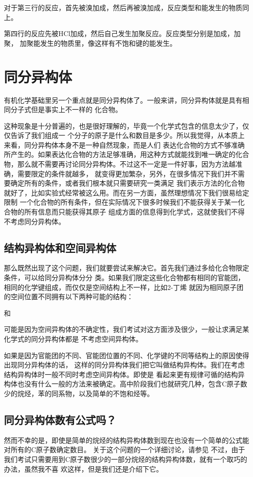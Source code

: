对于第三行的反应，首先被溴加成，然后再被溴加成，反应类型和能发生的物质同上。

第四行的反应先被HCl加成，然后自己发生加聚反应。反应类型分别是加成，加聚，
加聚能发生的物质里，像这样有不饱和键的能发生。

\section{同分异构体}
有机化学基础里另一个重点就是同分异构体了。一般来讲，同分异构体就是具有相同分子式但是事实上不一样的
化合物。

这种现象是十分普遍的，也是很好理解的，毕竟一个化学式包含的信息太少了，仅仅告诉了我们组成一
个分子的原子是什么和数目是多少。所以我觉得，从本质上来看，同分异构体本身不是一种自然现象，而是人们
表达化合物的方式不够准确所产生的。如果表达化合物的方法足够准确，用这种方式就能找到唯一确定的化合
物，那么就不需要再讨论同分异构体。不过这不一定是一件好事，因为方法越准确，需要限定的条件就越多，
就变得更加繁杂，另外，在很多情况下我们并不需要确定所有的条件，或者我们根本就只需要研究一类满足
我们表示方法的化合物就好了，比如实验式经常被这么用。而在另一方面，虽然理想情况下我们很易给定限制
一个化合物的所有条件，但在实际情况下很多时候我们不能获得关于某一化合物的所有信息而只能获得其原子
组成方面的信息得到化学式，这就使我们不得不考虑同分异构体。

\subsection{结构异构体和空间异构体}
那么既然出现了这个问题，我们就要尝试来解决它。首先我们通过多给化合物限定条件，可以给同分异构体分分
类。如果我们限定这些化合物都有相同的官能团，相同的化学键组成，而仅仅是空间结构上不一样，比如2-丁烯
就因为相同原子团的空间位置不同拥有以下两种可能的结构：
\begin{center}
和
\end{center}
可能是因为空间异构体的不确定性，我们考试对这方面涉及很少，一般让求满足某化学式的同分异构体都是
不考虑空间异构体。

如果是因为官能团的不同、官能团位置的不同、化学键的不同等结构上的原因使得出现同分异构体的话，
这样的同分异构体我们把它叫做结构异构体。我们在考虑结构异构体时一般不同时考虑空间异构体。即使是
看起来更有规律可循的结构异构体也没有什么一般的方法来被确定。高中阶段我们也就研究几种，包含C原子数
少的烷烃，苯的同系物，以及简单的不饱和烃等。

\subsection{同分异构体数有公式吗？}
然而不幸的是，即使是简单的烷烃的结构异构体数到现在也没有一个简单的公式能对所有的C原子数确定数目。
关于这个问题的一个详细讨论，请参见\cite{NumNCarbonIsomers}
不过，由于我们考试只需要用到C原子数很少的一部分烷烃的结构异构体数，就有一个取巧的办法，虽然我不喜
欢这样，但是我们还是介绍下它。

